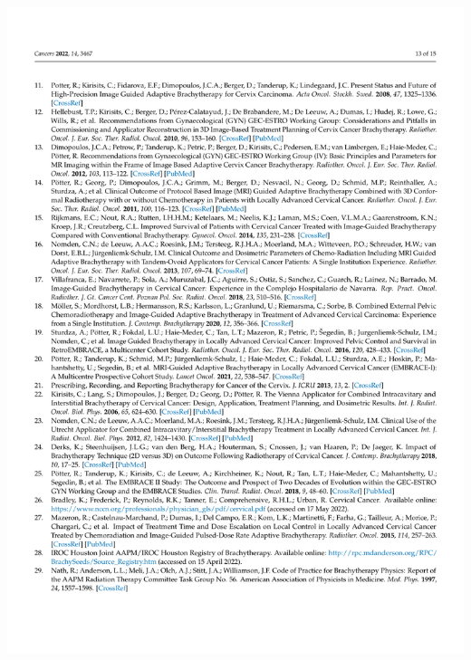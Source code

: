 \documentclass[
  a4paper,
]{scrreprt}
\begin{document}
\includegraphics{articulos/cancers/cancers-13.png}
\end{document}
